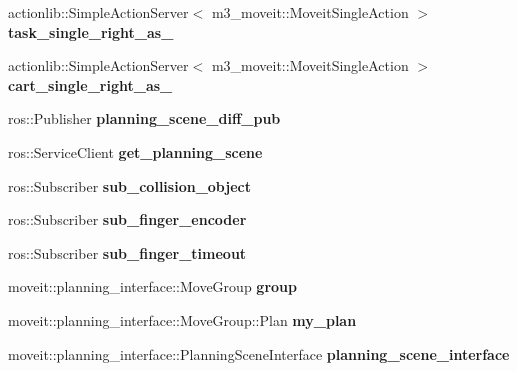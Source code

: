 \begin{DoxyCompactItemize}
\item 
\mbox{\label{classM3MoveGroup_ad288b520fde219efc3e7955e80657fb4}} 
actionlib\+::\+Simple\+Action\+Server$<$ m3\+\_\+moveit\+::\+Moveit\+Single\+Action $>$ {\bfseries task\+\_\+single\+\_\+right\+\_\+as\+\_\+}
\item 
\mbox{\label{classM3MoveGroup_a70fb5a8f33b7d6fd4198f23eb56ec439}} 
actionlib\+::\+Simple\+Action\+Server$<$ m3\+\_\+moveit\+::\+Moveit\+Single\+Action $>$ {\bfseries cart\+\_\+single\+\_\+right\+\_\+as\+\_\+}
\item 
\mbox{\label{classM3MoveGroup_a927f730062fc4485e57af9f44183dc3d}} 
ros\+::\+Publisher {\bfseries planning\+\_\+scene\+\_\+diff\+\_\+pub}
\item 
\mbox{\label{classM3MoveGroup_abfbeb8941ce265c30ab6509b5e951c75}} 
ros\+::\+Service\+Client {\bfseries get\+\_\+planning\+\_\+scene}
\item 
\mbox{\label{classM3MoveGroup_a69e8c12ee1246bd56a523599445027c5}} 
ros\+::\+Subscriber {\bfseries sub\+\_\+collision\+\_\+object}
\item 
\mbox{\label{classM3MoveGroup_a808c577edf16a04592f664f01ce5586a}} 
ros\+::\+Subscriber {\bfseries sub\+\_\+finger\+\_\+encoder}
\item 
\mbox{\label{classM3MoveGroup_a3fc5ec3b4bbbc60849dd53860a84ced4}} 
ros\+::\+Subscriber {\bfseries sub\+\_\+finger\+\_\+timeout}
\item 
\mbox{\label{classM3MoveGroup_a01b49af975aad4adf9bdd8c183dbad96}} 
moveit\+::planning\+\_\+interface\+::\+Move\+Group {\bfseries group}
\item 
\mbox{\label{classM3MoveGroup_a19d5a6f059e146382018c4e73880ff63}} 
moveit\+::planning\+\_\+interface\+::\+Move\+Group\+::\+Plan {\bfseries my\+\_\+plan}
\item 
\mbox{\label{classM3MoveGroup_aae4a2f78dcc5b36b9d81f729c46e9ea9}} 
moveit\+::planning\+\_\+interface\+::\+Planning\+Scene\+Interface {\bfseries planning\+\_\+scene\+\_\+interface}

\end{DoxyCompactItemize}
